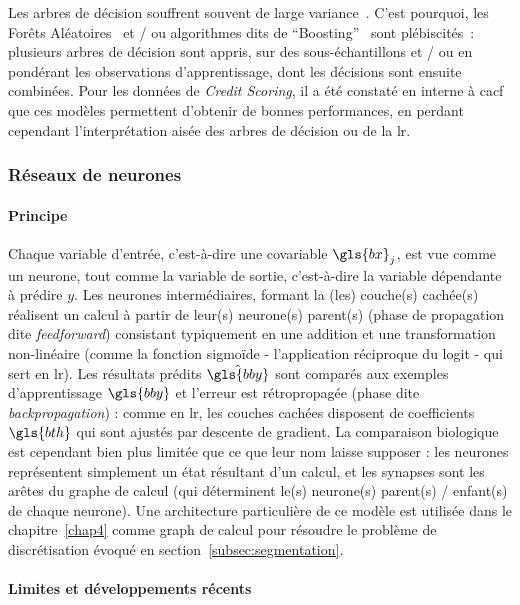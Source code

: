 Les arbres de décision souffrent souvent de large variance~\cite{geurts2000investigation}. C'est pourquoi, les Forêts Aléatoires~\cite{breiman2001random} et / ou algorithmes dits de ``Boosting''~\cite{zhou2012ensemble} sont plébiscités~: plusieurs arbres de décision sont appris, sur des sous-échantillons et / ou en pondérant les observations d'apprentissage, dont les décisions sont ensuite combinées. Pour les données de \textit{Credit Scoring}, il a été constaté en interne à \gls{cacf} que ces modèles permettent d'obtenir de bonnes performances, en perdant cependant l'interprétation aisée des arbres de décision ou de la \gls{lr}.

\subsubsection{Réseaux de neurones}

\paragraph{Principe}

Chaque variable d'entrée, c'est-à-dire une covariable $\gls{bx}_j$, est vue comme un neurone, tout comme la variable de sortie, c'est-à-dire la variable dépendante à prédire $y$. Les neurones intermédiaires, formant la (les) couche(s) cachée(s) réalisent un calcul à partir de leur(s) neurone(s) parent(s) (phase de propagation dite \textit{feedforward}) consistant typiquement en une addition et une transformation non-linéaire (comme la fonction  sigmoïde - l'application réciproque du logit - qui sert en \gls{lr}). Les résultats prédits $\hat{\gls{bby}}$ sont comparés aux exemples d'apprentissage $\gls{bby}$ et l'erreur est rétropropagée (phase dite \textit{backpropagation}) : comme en \gls{lr}, les couches cachées disposent de coefficients $\gls{bth}$ qui sont ajustés par descente de gradient. La comparaison biologique est cependant bien plus limitée que ce que leur nom laisse supposer : les neurones représentent simplement un état résultant d'un calcul, et les synapses sont les arêtes du graphe de calcul (qui déterminent le(s) neurone(s) parent(s) / enfant(s) de chaque neurone). Une architecture particulière de ce modèle est utilisée dans le chapitre~\ref{chap4} comme graph de calcul pour résoudre le problème de discrétisation évoqué en section~\ref{subsec:segmentation}.

\paragraph{Limites et développements récents}

